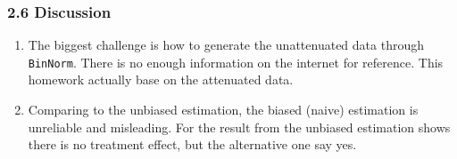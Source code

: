 \documentclass[
]{article}
\begin{document}
\hypertarget{discussion}{%
\subsubsection{2.6 Discussion}\label{discussion}}

\begin{enumerate}
\def\labelenumi{(\alph{enumi})}
\item
  The biggest challenge is how to generate the unattenuated data through
  \texttt{BinNorm}. There is no enough information on the internet for
  reference. This homework actually base on the attenuated data.
\item
  Comparing to the unbiased estimation, the biased (naive) estimation is
  unreliable and misleading. For the result from the unbiased estimation
  shows there is no treatment effect, but the alternative one say yes.
\end{enumerate}
\end{document}

